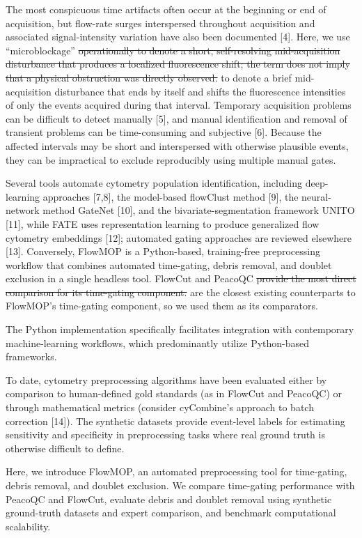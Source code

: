 \documentclass[ASNA]{latex/wiley/USG}
\begin{document}
The most conspicuous time artifacts often occur at the beginning or end
of acquisition, but flow-rate surges interspersed throughout acquisition
and associated signal-intensity variation have also been documented
{[}4{]}. Here, we use ``microblockage''
{\color{revisionred}\sout{operationally to denote a short,
self-resolving mid-acquisition disturbance that produces a localized
fluorescence shift; the term does not imply that a physical obstruction
was directly observed.}} {\color{revisionblue}to denote a brief
mid-acquisition disturbance that ends by itself and shifts the
fluorescence intensities of only the events acquired during that
interval.} Temporary acquisition problems can be difficult to detect
manually {[}5{]}, and manual identification and removal of transient
problems can be time-consuming and subjective {[}6{]}. Because the
affected intervals may be short and interspersed with otherwise
plausible events, they can be impractical to exclude reproducibly using
multiple manual gates.

Several tools automate cytometry population identification, including
deep-learning approaches {[}7,8{]}, the model-based flowClust method
{[}9{]}, the neural-network method GateNet {[}10{]}, and the
bivariate-segmentation framework UNITO {[}11{]}, while FATE uses
representation learning to produce generalized flow cytometry embeddings
{[}12{]}; automated gating approaches are reviewed elsewhere {[}13{]}.
Conversely, FlowMOP is a Python-based, training-free preprocessing
workflow that combines automated time-gating, debris removal, and
doublet exclusion in a single headless tool. FlowCut and PeacoQC
{\color{revisionred}\sout{provide the most direct comparison for its
time-gating component.}} {\color{revisionblue}are the closest existing
counterparts to FlowMOP's time-gating component, so we used them as its
comparators.}

The Python implementation specifically facilitates integration with
contemporary machine-learning workflows, which predominantly utilize
Python-based frameworks.

To date, cytometry preprocessing algorithms have been evaluated either
by comparison to human-defined gold standards (as in FlowCut and
PeacoQC) or through mathematical metrics (consider cyCombine's approach
to batch correction {[}14{]}). The synthetic datasets provide
event-level labels for estimating sensitivity and specificity in
preprocessing tasks where real ground truth is otherwise difficult to
define.

Here, we introduce FlowMOP, an automated preprocessing tool for
time-gating, debris removal, and doublet exclusion. We compare
time-gating performance with PeacoQC and FlowCut, evaluate debris and
doublet removal using synthetic ground-truth datasets and expert
comparison, and benchmark computational scalability.
\end{document}

